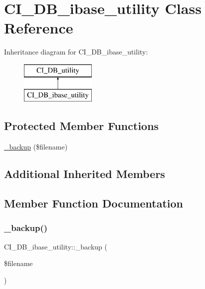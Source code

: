 \hypertarget{class_c_i___d_b__ibase__utility}{}\section{C\+I\+\_\+\+D\+B\+\_\+ibase\+\_\+utility Class Reference}
\label{class_c_i___d_b__ibase__utility}
Inheritance diagram for C\+I\+\_\+\+D\+B\+\_\+ibase\+\_\+utility\+:\begin{figure}[H]
\begin{center}
\leavevmode
\includegraphics[height=2.000000cm]{class_c_i___d_b__ibase__utility}
\end{center}
\end{figure}
\subsection*{Protected Member Functions}
\begin{DoxyCompactItemize}
\item 
\mbox{\hyperlink{class_c_i___d_b__ibase__utility_a2d2dcfd44ac0d9420463773c14911487}{\+\_\+backup}} (\$filename)
\end{DoxyCompactItemize}
\subsection*{Additional Inherited Members}


\subsection{Member Function Documentation}
\mbox{\label{class_c_i___d_b__ibase__utility_a2d2dcfd44ac0d9420463773c14911487}} 
\subsubsection{\texorpdfstring{\+\_\+backup()}{\_backup()}}
{\footnotesize\ttfamily C\+I\+\_\+\+D\+B\+\_\+ibase\+\_\+utility\+::\+\_\+backup (\begin{DoxyParamCaption}\item[{}]{\$filename }\end{DoxyParamCaption})\hspace{0.3cm}{\ttfamily [protected]}}

